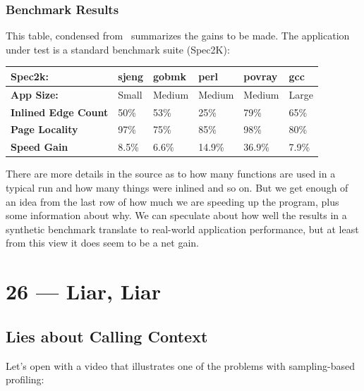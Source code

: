 \documentclass[a4paper]{report}
\begin{document}
\subsection*{Benchmark Results}

This table, condensed from~\cite{pogo2} summarizes the gains to be made. The application under test is a standard benchmark suite (Spec2K):

\begin{center}
\begin{tabular}{l|l|l|l|l|l}
	\textbf{Spec2k:} & \textbf{sjeng} & \textbf{gobmk} & \textbf{perl} & \textbf{povray} & \textbf{gcc}\\ \hline
	\textbf{App Size:} &  {Small} & {Medium} & {Medium} & {Medium} & {Large} \\ \hline
	\textbf{Inlined Edge Count} & 50\% & 53\% & 25\% & 79\% & 65\% \\ \hline
	\textbf{Page Locality} & 97\% & 75\% & 85\% & 98\% & 80\% \\ \hline
	\textbf{Speed Gain} & 8.5\% & 6.6\% & 14.9\% & 36.9\% & 7.9\% \\ 
\end{tabular}
\end{center}

There are more details in the source as to how many functions are used in a typical run and how many things were inlined and so on. But we get enough of an idea from the last row of how much we are speeding up the program, plus some information about why. We can speculate about how well the results in a synthetic benchmark translate to real-world application performance, but at least from this view it does seem to be a net gain.










\chapter*{26 --- Liar, Liar}


\section*{Lies about Calling Context}

Let's open with a video that illustrates one of the problems with sampling-based profiling:
\end{document}

